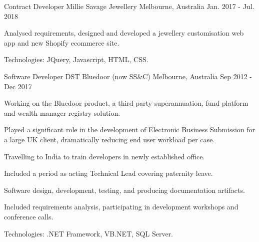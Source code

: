 \begin{cventries}
\cventry
{Contract Developer} %
{Millie Savage Jewellery} %
{Melbourne, Australia} %
{Jan. 2017 - Jul. 2018} %
{
  \begin{cvitems} %
    \item {Analysed requirements, designed and developed a jewellery customisation web app and new Shopify ecommerce site.}
    \item {Technologies: JQuery, Javascript, HTML, CSS.}
  \end{cvitems}
}

\cventry
{Software Developer} %
{DST Bluedoor (now SS\&C)} %
{Melbourne, Australia} %
{Sep 2012 - Dec 2017} %
{
  \begin{cvitems} %
    \item {Working on the Bluedoor product, a third party superannuation, fund platform and wealth manager registry solution.}
    \item {Played a significant role in the development of Electronic Business Submission for a large UK client, dramatically reducing end user workload per case.}
    \item {Travelling to India to train developers in newly established office.}
    \item {Included a period as acting Technical Lead covering paternity leave.}
    \item {Software design, development, testing, and producing documentation artifacts.}
    \item {Included requirements analysis, participating in development workshops and conference calls.}
    \item {Technologies: .NET Framework, VB.NET, SQL Server.}
  \end{cvitems}
}

\end{cventries}
